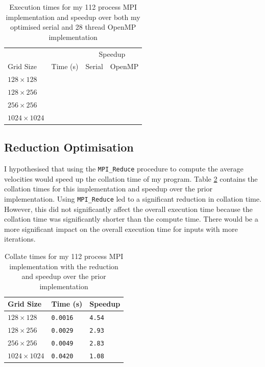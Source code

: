 \documentclass[twocolumn, a4paper]{article}
\begin{document}
\begin{table}[htbp]
  \begin{center}
  \caption{Execution times for my 112 process MPI implementation and speedup over both my optimised serial and 28 thread OpenMP implementation}\label{tab:mpi}
  \begin{tabular}[t]{l | l  l  l} 
      \hline\hline
      &&\multicolumn{2}{c}{Speedup}\\
      \cline{3-4}
      Grid Size&Time (s)&Serial&OpenMP\\
      \hline
      $128 \times 128$&\texttt{}&\texttt{}&\texttt{}\\
      $128 \times 256$&\texttt{}&\texttt{}&\texttt{}\\
      $256 \times 256$&\texttt{}&\texttt{}&\texttt{}\\
      $1024 \times 1024$&\texttt{}&\texttt{}&\texttt{}\\
      \hline
    \end{tabular}
  \end{center}
  \vspace{-1em}
\end{table}

\subsection{Reduction Optimisation}

I hypothesised that using the \texttt{MPI\_Reduce} procedure to compute the average velocities would speed up the collation time of my program.
Table \ref{tab:reduction} contains the collation times for this implementation and speedup over the prior implementation.
Using \texttt{MPI\_Reduce} led to a significant reduction in collation time.
However, this did not significantly affect the overall execution time because the collation time was significantly shorter than the compute time.
There would be a more significant impact on the overall execution time for inputs with more iterations.

\begin{table}[htbp]
  \begin{center}
  \caption{Collate times for my 112 process MPI implementation with the reduction and speedup over the prior implementation}\label{tab:reduction}
  \begin{tabular}[t]{l | l l} 
      \hline\hline
      Grid Size&Time (s)&Speedup\\
      \hline
      $128 \times 128$&\texttt{0.0016}&\texttt{4.54}\\
      $128 \times 256$&\texttt{0.0029}&\texttt{2.93}\\
      $256 \times 256$&\texttt{0.0049}&\texttt{2.83}\\
      $1024 \times 1024$&\texttt{0.0420}&\texttt{1.08}\\
      \hline
    \end{tabular}
  \end{center}
  \vspace{-1em}
\end{table}
\end{document}

